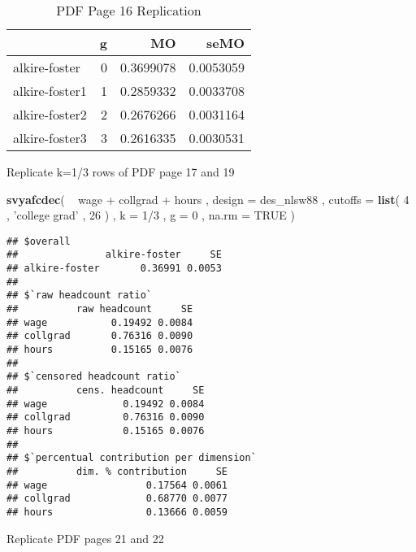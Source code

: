 \documentclass[]{book}
\newenvironment{Shaded}{\begin{snugshade}}{\end{snugshade}}
\newcommand{\KeywordTok}[1]{\textcolor[rgb]{0.13,0.29,0.53}{\textbf{{#1}}}}
\newcommand{\DataTypeTok}[1]{\textcolor[rgb]{0.13,0.29,0.53}{{#1}}}
\newcommand{\DecValTok}[1]{\textcolor[rgb]{0.00,0.00,0.81}{{#1}}}
\newcommand{\StringTok}[1]{\textcolor[rgb]{0.31,0.60,0.02}{{#1}}}
\newcommand{\OtherTok}[1]{\textcolor[rgb]{0.56,0.35,0.01}{{#1}}}
\newcommand{\NormalTok}[1]{{#1}}
\begin{document}
\begin{table}

\caption{\label{tab:unnamed-chunk-61}PDF Page 16 Replication}
\centering
\begin{tabular}[t]{lrrr}
\toprule
  & g & MO & seMO\\
\midrule
alkire-foster & 0 & 0.3699078 & 0.0053059\\
alkire-foster1 & 1 & 0.2859332 & 0.0033708\\
alkire-foster2 & 2 & 0.2676266 & 0.0031164\\
alkire-foster3 & 3 & 0.2616335 & 0.0030531\\
\bottomrule
\end{tabular}
\end{table}

Replicate k=1/3 rows of PDF page 17 and 19

\begin{Shaded}
\begin{Highlighting}[]
\KeywordTok{svyafcdec}\NormalTok{(}
    \NormalTok{~}\StringTok{ }\NormalTok{wage +}\StringTok{ }\NormalTok{collgrad +}\StringTok{ }\NormalTok{hours , }
    \DataTypeTok{design =} \NormalTok{des_nlsw88 , }
    \DataTypeTok{cutoffs =} \KeywordTok{list}\NormalTok{( }\DecValTok{4} \NormalTok{, }\StringTok{'college grad'} \NormalTok{, }\DecValTok{26} \NormalTok{) , }
    \DataTypeTok{k =} \DecValTok{1}\NormalTok{/}\DecValTok{3} \NormalTok{, }
    \DataTypeTok{g =} \DecValTok{0} \NormalTok{,}
    \DataTypeTok{na.rm =} \OtherTok{TRUE}
\NormalTok{)}
\end{Highlighting}
\end{Shaded}

\begin{verbatim}
## $overall
##               alkire-foster     SE
## alkire-foster       0.36991 0.0053
## 
## $`raw headcount ratio`
##          raw headcount     SE
## wage           0.19492 0.0084
## collgrad       0.76316 0.0090
## hours          0.15165 0.0076
## 
## $`censored headcount ratio`
##          cens. headcount     SE
## wage             0.19492 0.0084
## collgrad         0.76316 0.0090
## hours            0.15165 0.0076
## 
## $`percentual contribution per dimension`
##          dim. % contribution     SE
## wage                 0.17564 0.0061
## collgrad             0.68770 0.0077
## hours                0.13666 0.0059
\end{verbatim}

Replicate PDF pages 21 and 22
\end{document}
